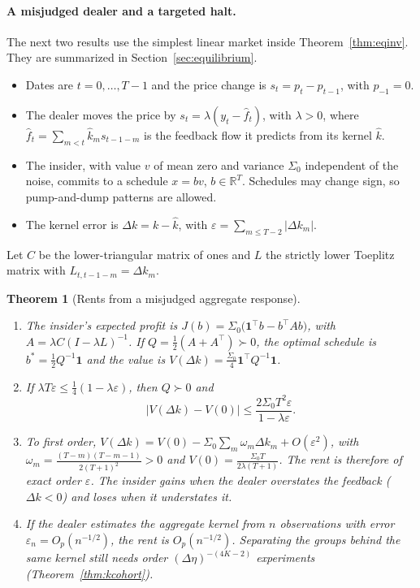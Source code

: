 \documentclass[12pt]{article}
\newtheorem{theorem}{Theorem}[section]
\theoremstyle{definition}
\theoremstyle{remark}
\newcommand{\R}{\mathbb{R}}
\begin{document}
\paragraph{A misjudged dealer and a targeted halt.} The next two results use the simplest linear market inside Theorem~\ref{thm:eqinv}. They are summarized in Section~\ref{sec:equilibrium}.
\begin{itemize}[itemsep=1pt,topsep=2pt]
\item Dates are $t=0,\ldots,T-1$ and the price change is $s_t=p_t-p_{t-1}$, with $p_{-1}=0$.
\item The dealer moves the price by $s_t=\lambda(y_t-\hat f_t)$, with $\lambda>0$, where $\hat f_t=\sum_{m<t}\hat k_ms_{t-1-m}$ is the feedback flow it predicts from its kernel $\hat k$.
\item The insider, with value $v$ of mean zero and variance $\Sigma_0$ independent of the noise, commits to a schedule $x=bv$, $b\in\R^T$. Schedules may change sign, so pump-and-dump patterns are allowed.
\item The kernel error is $\Delta k=k-\hat k$, with $\varepsilon=\sum_{m\le T-2}|\Delta k_m|$.
\end{itemize}
Let $C$ be the lower-triangular matrix of ones and $L$ the strictly lower Toeplitz matrix with $L_{t,t-1-m}=\Delta k_m$.

\begin{theorem}[Rents from a misjudged aggregate response]\label{thm:rents}
\begin{enumerate}[label=(\roman*),itemsep=1pt]
\item The insider's expected profit is $J(b)=\Sigma_0\bigl(\mathbf 1^\top b-b^\top A b\bigr)$, with $A=\lambda C(I-\lambda L)^{-1}$. If $Q=\tfrac12(A+A^\top)\succ0$, the optimal schedule is $b^*=\tfrac12Q^{-1}\mathbf1$ and the value is $V(\Delta k)=\tfrac{\Sigma_0}4\mathbf1^\top Q^{-1}\mathbf1$.
\item If $\lambda T\varepsilon\le\tfrac14(1-\lambda\varepsilon)$, then $Q\succ0$ and
\[
 |V(\Delta k)-V(0)|\le\frac{2\Sigma_0T^2\varepsilon}{1-\lambda\varepsilon}.
\]
\item To first order, $V(\Delta k)=V(0)-\Sigma_0\sum_m\omega_m\Delta k_m+O(\varepsilon^2)$, with $\omega_m=\frac{(T-m)(T-m-1)}{2(T+1)^2}>0$ and $V(0)=\frac{\Sigma_0T}{2\lambda(T+1)}$. The rent is therefore of exact order $\varepsilon$. The insider gains when the dealer overstates the feedback ($\Delta k<0$) and loses when it understates it.
\item If the dealer estimates the aggregate kernel from $n$ observations with error $\varepsilon_n=O_p(n^{-1/2})$, the rent is $O_p(n^{-1/2})$. Separating the groups behind the same kernel still needs order $(\Delta\eta)^{-(4K-2)}$ experiments (Theorem~\ref{thm:kcohort}).
\end{enumerate}
\end{theorem}
\end{document}
